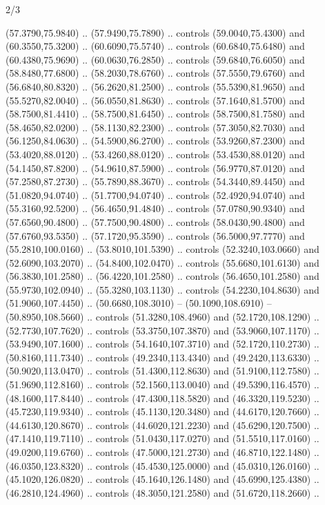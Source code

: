 \begin{flagdescription}{2/3}
\begin{scope}[xshift=0.5\flaglength,yshift=0.5\flagwidth,scale=\stretchfactor]
\begin{scope}[scale=0.001645\flagwidth,yshift=65mm,xshift=-63mm]
\begin{scope}[y=0.80pt, x=0.80pt, yscale=-1,]
\begin{scope}[cm={{1.33333,0.0,0.0,1.33333,(0.0,1e-05)}}]
  (57.3790,75.9840) .. (57.9490,75.7890) .. controls (59.0040,75.4300) and
  (60.3550,75.3200) .. (60.6090,75.5740) .. controls (60.6840,75.6480) and
  (60.4380,75.9690) .. (60.0630,76.2850) .. controls (59.6840,76.6050) and
  (58.8480,77.6800) .. (58.2030,78.6760) .. controls (57.5550,79.6760) and
  (56.6840,80.8320) .. (56.2620,81.2500) .. controls (55.5390,81.9650) and
  (55.5270,82.0040) .. (56.0550,81.8630) .. controls (57.1640,81.5700) and
  (58.7500,81.4410) .. (58.7500,81.6450) .. controls (58.7500,81.7580) and
  (58.4650,82.0200) .. (58.1130,82.2300) .. controls (57.3050,82.7030) and
  (56.1250,84.0630) .. (54.5900,86.2700) .. controls (53.9260,87.2300) and
  (53.4020,88.0120) .. (53.4260,88.0120) .. controls (53.4530,88.0120) and
  (54.1450,87.8200) .. (54.9610,87.5900) .. controls (56.9770,87.0120) and
  (57.2580,87.2730) .. (55.7890,88.3670) .. controls (54.3440,89.4450) and
  (51.0820,94.0740) .. (51.7700,94.0740) .. controls (52.4920,94.0740) and
  (55.3160,92.5200) .. (56.4650,91.4840) .. controls (57.0780,90.9340) and
  (57.6560,90.4800) .. (57.7500,90.4800) .. controls (58.0430,90.4800) and
  (57.6760,93.5350) .. (57.1720,95.3590) .. controls (56.5000,97.7770) and
  (55.2810,100.0160) .. (53.8010,101.5390) .. controls (52.3240,103.0660) and
  (52.6090,103.2070) .. (54.8400,102.0470) .. controls (55.6680,101.6130) and
  (56.3830,101.2580) .. (56.4220,101.2580) .. controls (56.4650,101.2580) and
  (55.9730,102.0940) .. (55.3280,103.1130) .. controls (54.2230,104.8630) and
  (51.9060,107.4450) .. (50.6680,108.3010) -- (50.1090,108.6910) --
  (50.8950,108.5660) .. controls (51.3280,108.4960) and (52.1720,108.1290) ..
  (52.7730,107.7620) .. controls (53.3750,107.3870) and (53.9060,107.1170) ..
  (53.9490,107.1600) .. controls (54.1640,107.3710) and (52.1720,110.2730) ..
  (50.8160,111.7340) .. controls (49.2340,113.4340) and (49.2420,113.6330) ..
  (50.9020,113.0470) .. controls (51.4300,112.8630) and (51.9100,112.7580) ..
  (51.9690,112.8160) .. controls (52.1560,113.0040) and (49.5390,116.4570) ..
  (48.1600,117.8440) .. controls (47.4300,118.5820) and (46.3320,119.5230) ..
  (45.7230,119.9340) .. controls (45.1130,120.3480) and (44.6170,120.7660) ..
  (44.6130,120.8670) .. controls (44.6020,121.2230) and (45.6290,120.7500) ..
  (47.1410,119.7110) .. controls (51.0430,117.0270) and (51.5510,117.0160) ..
  (49.0200,119.6760) .. controls (47.5000,121.2730) and (46.8710,122.1480) ..
  (46.0350,123.8320) .. controls (45.4530,125.0000) and (45.0310,126.0160) ..
  (45.1020,126.0820) .. controls (45.1640,126.1480) and (45.6990,125.4380) ..
  (46.2810,124.4960) .. controls (48.3050,121.2580) and (51.6720,118.2660) ..

\end{scope}
\end{scope}
\end{scope}
\end{scope}
\end{flagdescription}
